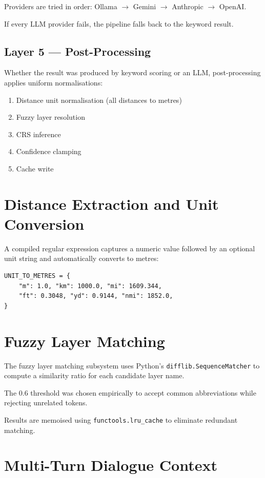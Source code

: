 \documentclass[12pt,a4paper]{report}
\begin{document}
Providers are tried in order: Ollama $\rightarrow$ Gemini $\rightarrow$ Anthropic $\rightarrow$ OpenAI.

If every LLM provider fails, the pipeline falls back to the keyword result.

\subsection{Layer 5 — Post-Processing}

Whether the result was produced by keyword scoring or an LLM, post-processing applies uniform normalisations:

\begin{enumerate}
  \item Distance unit normalisation (all distances to metres)
  \item Fuzzy layer resolution
  \item CRS inference
  \item Confidence clamping
  \item Cache write
\end{enumerate}

\section{Distance Extraction and Unit Conversion}

A compiled regular expression captures a numeric value followed by an optional unit string and automatically converts to metres:

\begin{lstlisting}
UNIT_TO_METRES = {
    "m": 1.0, "km": 1000.0, "mi": 1609.344,
    "ft": 0.3048, "yd": 0.9144, "nmi": 1852.0,
}
\end{lstlisting}

\section{Fuzzy Layer Matching}

The fuzzy layer matching subsystem uses Python's \texttt{difflib.SequenceMatcher} to compute a similarity ratio for each candidate layer name.

The 0.6 threshold was chosen empirically to accept common abbreviations while rejecting unrelated tokens.

Results are memoised using \texttt{functools.lru\_cache} to eliminate redundant matching.

\section{Multi-Turn Dialogue Context}
\end{document}

